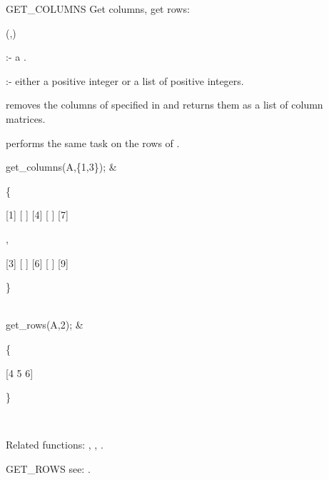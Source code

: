 \begin{Operator}[getcolumns]{GET_COLUMNS}
Get columns, get rows:

\begin{Syntax}
(,)
\end{Syntax}

 :- a .

      :- either a positive integer or a list of positive 
                 integers.

 removes the columns of  specified in 
 and returns them as a list of column matrices. 

 performs the same task on the rows of . 

\begin{Examples}

get_columns(A,\{1,3\}); & 
\begin{multilineoutput}{6cm}
\{

 [1]
 [ ]
 [4]
 [ ]
 [7]

 ,

 [3]
 [ ]
 [6]
 [ ]
 [9]

\}
\end{multilineoutput} \\

get_rows(A,2); &
\begin{multilineoutput}{6cm}
\{

 [4  5  6]

\}
\end{multilineoutput} \\

\end{Examples}

Related functions:
, , .

\end{Operator}


\begin{Operator}[getrows]{GET_ROWS}
see:  .
\end{Operator}


